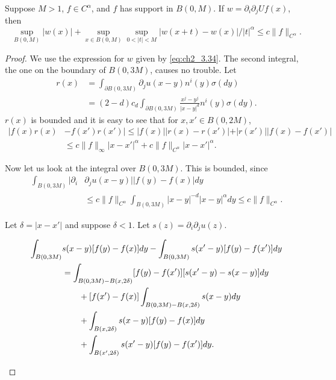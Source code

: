 \begin{theorem}\label{thm:ch2_3.14}
Suppose $M > 1$, $f \in C^\alpha$, and $f$ has support in $B(0,M)$. If $w = \partial_i\partial_jUf(x)$, then
\[
    \sup_{B(0,M)} |w(x)| + \sup_{x\in B(0,M)} \sup_{0<|t|<M} |w(x+t) - w(x)|/|t|^\alpha \leq c\|f\|_{C^\alpha}.
\]
\end{theorem}

\begin{proof}
We use the expression for $w$ given by \eqref{eq:ch2_3.34}. The second integral, the one on the boundary of $B(0,3M)$, causes no trouble. Let
\begin{align*}
    r(x) &= \int_{\partial B(0,3M)} \partial_ju(x-y)n^i(y)\sigma(dy) \\
    &= (2-d)c_d\int_{\partial B(0,3M)} \frac{x^j-y^j}{|x-y|^d}n^i(y)\sigma(dy).
\end{align*}
$r(x)$ is bounded and it is easy to see that for $x,x' \in B(0,2M)$,
\begin{align*}
    |f(x)r(x) &- f(x')r(x')| \leq |f(x)||r(x) - r(x')| + |r(x')||f(x) - f(x')| \\
    &\leq c\|f\|_\infty|x-x'|^\alpha + c\|f\|_{C^\alpha}|x-x'|^\alpha.
\end{align*}

Now let us look at the integral over $B(0,3M)$. This is bounded, since
\begin{align*}
    \int_{B(0,3M)} |\partial_i&\partial_ju(x-y)||f(y) - f(x)|dy \\
    &\leq c\|f\|_{C^\alpha} \int_{B(0,3M)} |x-y|^{-d}|x-y|^\alpha dy \leq c\|f\|_{C^\alpha}.
\end{align*}

Let $\delta = |x-x'|$ and suppose $\delta < 1$. Let $s(z) = \partial_i\partial_ju(z)$.
\begin{adjustwidth}{0cm}{-2.62mm}
\begin{align}\label{eq:ch2_3.36}
    \int_{B(0,3M)} &s(x-y)[f(y) - f(x)]dy - \int_{B(0,3M)} s(x'-y)[f(y) - f(x')]dy \\
    &= \int_{B(0,3M)-B(x,2\delta)}[f(y) - f(x')][s(x'-y) - s(x-y)]dy \notag \\
    &\qquad+ [f(x') - f(x)]\int_{B(0,3M)-B(x,2\delta)} s(x-y)dy \notag \\
    &\qquad+ \int_{B(x,2\delta)} s(x-y)[f(y) - f(x)]dy \notag \\
    &\qquad+ \int_{B(x',2\delta)} s(x'-y)[f(y) - f(x')]dy. \notag
\end{align}
\end{adjustwidth}


\end{proof}
